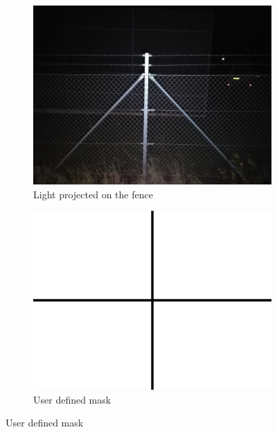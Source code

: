 \documentclass[../Head/Main.tex]{subfiles}
\begin{document}
\begin{figure}[H]
    \centering
    \begin{subfigure}{.32\textwidth}
        \centering
        \includegraphics[width=\textwidth]{../Figures/fourier_transformation/dark_img1.jpg}
        \caption{Light projected on the fence}
        \label{fig:image_light_projected}
    \end{subfigure}
    \hfill
    \begin{subfigure}{.32\textwidth}
        \centering
        \includegraphics[width=\textwidth]{../Figures/userdefinedmask.png}
        \caption{User defined mask}
        \label{fig:user_defined_mask}
    \end{subfigure}
    \hfill

\end{figure}
\end{document}
